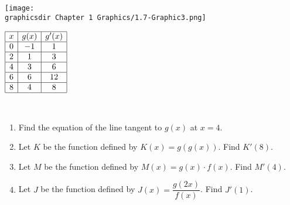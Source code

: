  \\
\begin{minipage}[t]{0.75\textwidth} \vspace{0pt}%
    \texttt{[image: \\graphicsdir Chapter 1 Graphics/1.7-Graphic3.png]}
\end{minipage} \hfill \begin{minipage}[t]{0.2\textwidth} \vspace{0pt}%
    \def\arraystretch{1.4}
    $\begin{array}{|c|c|c|}
        \hline
        x & g(x) & g'(x) \\ \hline
        0 & -1 & 1 \\ \hline
        2 & 1 & 3 \\ \hline
        4 & 3 & 6 \\ \hline
        6 & 6 & 12 \\ \hline
        8 & 4 & 8 \\
        \hline
    \end{array}$
\end{minipage} \\

\begin{enumerate}[label=\hspace{11pt}(\alph*), align=left, leftmargin=*, labelsep=0.25em]
    \item Find the equation of the line tangent to $g(x)$ at $x = 4$.
    \item Let $K$ be the function defined by $K(x) = g(g(x))$. Find $K'(8)$.
    \item Let $M$ be the function defined by $M(x) = g(x) \cdot f(x)$. Find $M'(4)$.
    \item Let $J$ be the function defined by $J(x) = \dfrac{g(2x)}{f(x)}$. Find $J'(1)$.
\end{enumerate} \vspace{11pt}

